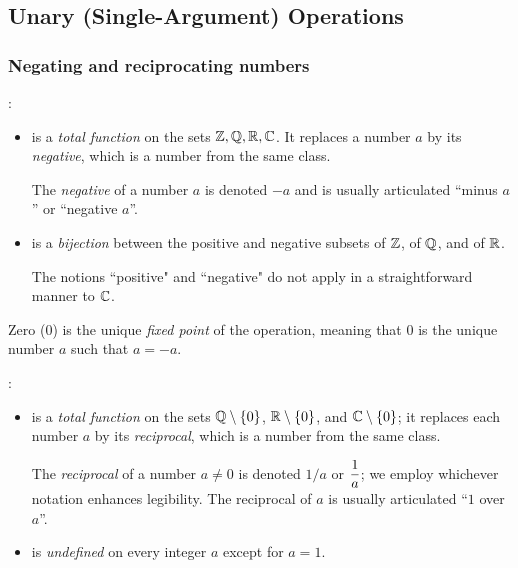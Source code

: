 \subsection{Unary (Single-Argument) Operations}
\label{sec:unary-ops}

\subsubsection{Negating and reciprocating numbers}
 

:
\begin{itemize}
\item
is a {\em total function} on the sets $\mathbb{Z}, \mathbb{Q}, \mathbb{R}, \mathbb{C}$.  It replaces a number $a$ by its {\em negative}, which is a number from the same class.

\smallskip

The {\it negative} of a number $a$ is denoted $-a$ and is usually articulated ``minus $a$'' or ``negative $a$''.
\medskip\item
is a {\em bijection} between the positive and negative subsets of $\mathbb{Z}$, of $\mathbb{Q}$, and of $\mathbb{R}$.

\smallskip

The notions ``positive" and ``negative" do not apply in a straightforward manner to $\mathbb{C}$.

\end{itemize}
Zero ($0$) is the unique {\it fixed point} of the operation, meaning that $0$ is the unique number $a$ such that $a = -a$.
 

\medskip

 

:
\begin{itemize}
\item
is a {\em total function} on the sets $\mathbb{Q} \setminus \{0\}$, $\mathbb{R} \setminus \{0\}$, and $\mathbb{C} \setminus \{0\}$; it replaces each number $a$ by its {\em reciprocal}, which is a number from the same class.

\smallskip

The {\it reciprocal} of  a number $a \neq 0$ is denoted $1/a$ or $\displaystyle {1 \over a}$; we employ whichever notation enhances legibility.  The reciprocal of $a$ is usually articulated ``$1$ over $a$''.

\medskip\item
is {\em undefined} on every integer $a$ except for $a=1$.
\end{itemize}

